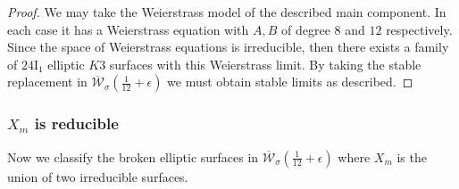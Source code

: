 \documentclass[11pt]{amsart}
\theoremstyle{definition}
\theoremstyle{remark}
\newcommand{\calW}{\mathcal W}
\newcommand{\ktwelve}{\overline{\calW}_\sigma({\frac{1}{12}+\epsilon})}
\begin{document}
	\begin{proof} We may take the Weierstrass model of the described main component. In each case it has a Weierstrass equation with $A,B$ of degree $8$ and $12$ respectively. Since the space of Weierstrass equations is irreducible, then there exists a family of $24\mathrm{I}_1$ elliptic $K3$ surfaces with this Weierstrass limit. By taking the stable replacement in $\ktwelve$ we must obtain stable limits as described.  \end{proof}
	
	
	\subsubsection{$X_m$ is reducible} Now we classify the broken elliptic surfaces in $\ktwelve$ where $X_m$ is the union of two irreducible surfaces. 
	
	
	
\end{document}

